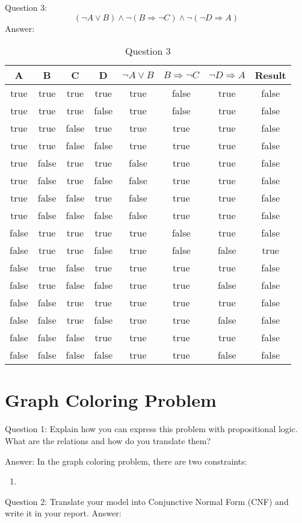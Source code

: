 \documentclass[12pt, a4paper]{report}
\begin{document}
Question 3:
\begin{equation}
    (\neg A \vee B) \wedge \neg (B \Rightarrow \neg C) \wedge \neg (\neg D \Rightarrow A)
\end{equation}
Answer:
\begin{table}[h]
    \centering
    \caption{Question 3}
    \begin{tabular}{|c|c|c|c|c|c|c|c|}
    \hline
    A & B & C & D & $\neg A \vee B$ & $B \Rightarrow \neg C$ & $\neg D \Rightarrow A$ & Result \\
    \hline
    true & true & true & true & true & false & true & false \\
    \hline
    true & true & true & false & true & false & true & false \\
    \hline
    true & true & false & true & true & true & true & false \\
    \hline
    true & true & false & false & true & true & true & false \\
    \hline
    true & false & true & true & false & true & true & false \\
    \hline
    true & false & true & false & false & true & true & false \\
    \hline
    true & false & false & true & false & true & true & false \\
    \hline
    true & false & false & false & false & true & true & false \\
    \hline
    false & true & true & true & true & false & true & false \\
    \hline
    false & true & true & false & true & false & false & true \\
    \hline
    false & true & false & true & true & true & true & false \\
    \hline
    false & true & false & false & true & true & false & false \\
    \hline
    false & false & true & true & true & true & true & false \\
    \hline
    false & false & true & false & true & true & false & false \\
    \hline
    false & false & false & true & true & true & true & false \\
    \hline
    false & false & false & false & true & true & false & false \\
    \hline
    \end{tabular}
\end{table}


\section{Graph Coloring Problem}

Question 1: Explain how you can express this problem with propositional logic. What are the relations and how do you translate them?

Answer:
In the graph coloring problem, there are two constraints:
\begin{enumerate}
    \item 

\end{enumerate}
Question 2: Translate your model into Conjunctive Normal Form (CNF) and write it in your report.
Answer:
\end{document}
